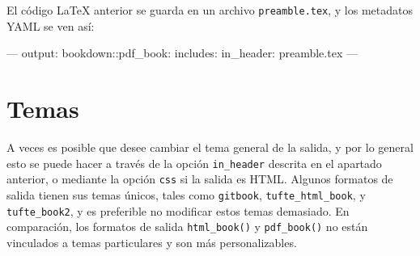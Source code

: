 \documentclass[12pt,]{krantz}
\makeatletter
\newenvironment{Shaded}{\begin{snugshade}}{\end{snugshade}}
\newcommand{\CommentTok}[1]{\textcolor[rgb]{0.56,0.35,0.01}{\textit{{#1}}}}
\newcommand{\OtherTok}[1]{\textcolor[rgb]{0.56,0.35,0.01}{{#1}}}
\newcommand{\FunctionTok}[1]{\textcolor[rgb]{0.00,0.00,0.00}{{#1}}}
\newcommand{\NormalTok}[1]{{#1}}
\newenvironment{kframe}{%
\medskip{}
\setlength{\fboxsep}{.8em}
 \def\at@end@of@kframe{}%
 \ifinner\ifhmode%
  \def\at@end@of@kframe{\end{minipage}}%
  \begin{minipage}{\columnwidth}%
 \fi\fi%
 \def\FrameCommand##1{\hskip\@totalleftmargin \hskip-\fboxsep
 \colorbox{shadecolor}{##1}\hskip-\fboxsep
     \hskip-\linewidth \hskip-\@totalleftmargin \hskip\columnwidth}%
 \MakeFramed {\advance\hsize-\width
   \@totalleftmargin\z@ \linewidth\hsize
   \@setminipage}}%
 {\par\unskip\endMakeFramed%
 \at@end@of@kframe}
\renewenvironment{Shaded}{\begin{kframe}}{\end{kframe}}
\theoremstyle{definition}
\theoremstyle{definition}
\theoremstyle{remark}
\makeatother
\begin{document}
\begin{Shaded}
\end{Shaded}

El código LaTeX anterior se guarda en un archivo \texttt{preamble.tex},
y los metadatos YAML se ven así:

\begin{Shaded}
\begin{Highlighting}[]
\OtherTok{---}
\FunctionTok{output:}
  \FunctionTok{bookdown:}\NormalTok{:pdf_book:}
    \FunctionTok{includes:}
      \FunctionTok{in_header:} \NormalTok{preamble.tex}
\OtherTok{---}
\end{Highlighting}
\end{Shaded}

\section{Temas}\label{temas}

A veces es posible que desee cambiar el tema general de la salida, y por
lo general esto se puede hacer a través de la opción \texttt{in\_header}
descrita en el apartado anterior, o mediante la opción \texttt{css} si
la salida es HTML. Algunos formatos de salida tienen sus temas únicos,
tales como \texttt{gitbook}, \texttt{tufte\_html\_book}, y
\texttt{tufte\_book2}, y es preferible no modificar estos temas
demasiado. En comparación, los formatos de salida \texttt{html\_book()}
y \texttt{pdf\_book()} no están vinculados a temas particulares y son
más personalizables.
\end{document}
